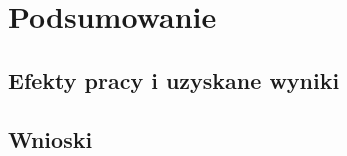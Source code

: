 \chapter{Podsumowanie}
\label{cha:podsumowanie}

\section{Efekty pracy i uzyskane wyniki}
\label{sec:wyniki}

\section{Wnioski}
\label{sec:wnioski}
